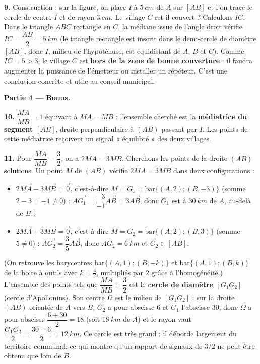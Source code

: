 \documentclass[11pt]{article}
\newcommand{\cle}[1]{{\popxbold\color{popdark}#1}}
\begin{document}
\begin{exoresolu}
\textbf{9.} Construction : sur la figure, on place $I$ à $\SI{5}{cm}$ de $A$ sur $[AB]$ et l'on trace le cercle de centre $I$ et de rayon $\SI{3}{cm}$. Le village $C$ est-il couvert ? Calculons $IC$. Dans le triangle $ABC$ rectangle en $C$, la médiane issue de l'angle droit vérifie $IC = \dfrac{AB}{2} = \SI{5}{km}$ (le triangle rectangle est inscrit dans le demi-cercle de diamètre $[AB]$, donc $I$, milieu de l'hypoténuse, est équidistant de $A$, $B$ et $C$). Comme $IC = 5 > 3$, le village $C$ est \textbf{hors de la zone de bonne couverture} : il faudra augmenter la puissance de l'émetteur ou installer un répéteur. C'est une conclusion concrète et utile au conseil municipal.

\textbf{Partie 4 — Bonus.}

\textbf{10.} $\dfrac{MA}{MB} = 1$ équivaut à $MA = MB$ : l'ensemble cherché est la \textbf{médiatrice du segment $[AB]$}, droite perpendiculaire à $(AB)$ passant par $I$. Les points de cette médiatrice reçoivent un signal « équilibré » des deux villages.

\textbf{11.} Pour $\dfrac{MA}{MB} = \dfrac{3}{2}$, on a $2MA = 3MB$. Cherchons les points de la droite $(AB)$ solutions. Un point $M$ de $(AB)$ vérifie $2MA = 3MB$ dans deux configurations :
\begin{itemize}
\item $2\overrightarrow{MA} - 3\overrightarrow{MB} = \vec{0}$, c'est-à-dire $M = G_1 = \mathrm{bar}\{(A, 2) ; (B, -3)\}$ (somme $2 - 3 = -1 \neq 0$) : $\overrightarrow{AG_1} = \dfrac{-3}{-1}\overrightarrow{AB} = 3\overrightarrow{AB}$, donc $G_1$ est à $\SI{30}{km}$ de $A$, au-delà de $B$ ;
\item $2\overrightarrow{MA} + 3\overrightarrow{MB} = \vec{0}$, c'est-à-dire $M = G_2 = \mathrm{bar}\{(A, 2) ; (B, 3)\}$ (somme $5 \neq 0$) : $\overrightarrow{AG_2} = \dfrac{3}{5}\overrightarrow{AB}$, donc $AG_2 = \SI{6}{km}$ et $G_2 \in [AB]$.
\end{itemize}
(On retrouve les barycentres $\mathrm{bar}\{(A,1);(B,-k)\}$ et $\mathrm{bar}\{(A,1);(B,k)\}$ de la boîte à outils avec $k = \frac{3}{2}$, multipliés par $2$ grâce à l'\cle{homogénéité}.) L'ensemble des points tels que $\dfrac{MA}{MB} = \dfrac{3}{2}$ est le \textbf{cercle de diamètre $[G_1G_2]$} (cercle d'Apollonius). Son centre $\Omega$ est le milieu de $[G_1G_2]$ : sur la droite $(AB)$ orientée de $A$ vers $B$, $G_2$ a pour abscisse $6$ et $G_1$ l'abscisse $30$, donc $\Omega$ a pour abscisse $\dfrac{6+30}{2} = 18$ (soit $\SI{18}{km}$ de $A$) et le rayon vaut $\dfrac{G_1G_2}{2} = \dfrac{30 - 6}{2} = \SI{12}{km}$. Ce cercle est très grand : il déborde largement du territoire communal, ce qui montre qu'un rapport de signaux de $3/2$ ne peut être obtenu que loin de $B$.
\end{exoresolu}
\end{document}
